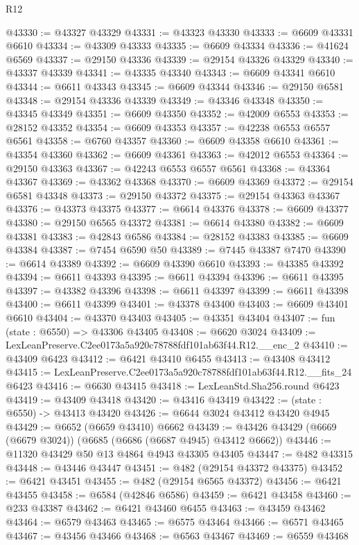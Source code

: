 \begin{lexlean}{R12}
\begin{coremodule}
@43330 := @43327 @43329
@43331 := @43323 @43330
@43333 := @6609 @43331 @6610
@43334 := @43309 @43333
@43335 := @6609 @43334
@43336 := @41624 @6569
@43337 := @29150 @43336
@43339 := @29154 @43326 @43329
@43340 := @43337 @43339
@43341 := @43335 @43340
@43343 := @6609 @43341 @6610
@43344 := @6611 @43343
@43345 := @6609 @43344
@43346 := @29150 @6581
@43348 := @29154 @43336 @43339
@43349 := @43346 @43348
@43350 := @43345 @43349
@43351 := @6609 @43350
@43352 := @42009 @6553
@43353 := @28152 @43352
@43354 := @6609 @43353
@43357 := @42238 @6553 @6557 @6561
@43358 := @6760 @43357
@43360 := @6609 @43358 @6610
@43361 := @43354 @43360
@43362 := @6609 @43361
@43363 := @42012 @6553
@43364 := @29150 @43363
@43367 := @42243 @6553 @6557 @6561
@43368 := @43364 @43367
@43369 := @43362 @43368
@43370 := @6609 @43369
@43372 := @29154 @6581 @43348
@43373 := @29150 @43372
@43375 := @29154 @43363 @43367
@43376 := @43373 @43375
@43377 := @6614 @43376
@43378 := @6609 @43377
@43380 := @29150 @6565 @43372
@43381 := @6614 @43380
@43382 := @6609 @43381
@43383 := @42843 @6586
@43384 := @28152 @43383
@43385 := @6609 @43384
@43387 := @7454 @6590 @50
@43389 := @7445 @43387 @7470
@43390 := @6614 @43389
@43392 := @6609 @43390 @6610
@43393 := @43385 @43392
@43394 := @6611 @43393
@43395 := @6611 @43394
@43396 := @6611 @43395
@43397 := @43382 @43396
@43398 := @6611 @43397
@43399 := @6611 @43398
@43400 := @6611 @43399
@43401 := @43378 @43400
@43403 := @6609 @43401 @6610
@43404 := @43370 @43403
@43405 := @43351 @43404
@43407 := fun (state : @6550) => @43306 @43405
@43408 := @6620 @3024
@43409 := LexLeanPreserve.C2ee0173a5a920c78788fdf101ab63f44.R12.__enc_2
@43410 := @43409 @6423
@43412 := @6421 @43410 @6455
@43413 := @43408 @43412
@43415 := LexLeanPreserve.C2ee0173a5a920c78788fdf101ab63f44.R12.__fits_24 @6423
@43416 := @6630 @43415
@43418 := LexLeanStd.Sha256.round @6423
@43419 := @43409 @43418
@43420 := @43416 @43419
@43422 := (state : @6550) -> @43413 @43420
@43426 := @6644 @3024 @43412 @43420 @4945
@43429 := @6652 (@6659 @43410) @6662
@43439 := @43426 @43429 (@6669 (@6679 @3024)) (@6685 (@6686 (@6687 @4945) @43412 @6662))
@43446 := @11320 @43429 @50 @13 @4864 @4943 @43305 @43405
@43447 := @482 @43315
@43448 := @43446 @43447
@43451 := @482 (@29154 @43372 @43375)
@43452 := @6421 @43451
@43455 := @482 (@29154 @6565 @43372)
@43456 := @6421 @43455
@43458 := @6584 (@42846 @6586)
@43459 := @6421 @43458
@43460 := @233 @43387
@43462 := @6421 @43460 @6455
@43463 := @43459 @43462
@43464 := @6579 @43463
@43465 := @6575 @43464
@43466 := @6571 @43465
@43467 := @43456 @43466
@43468 := @6563 @43467
@43469 := @6559 @43468

\end{coremodule}
\end{lexlean}
